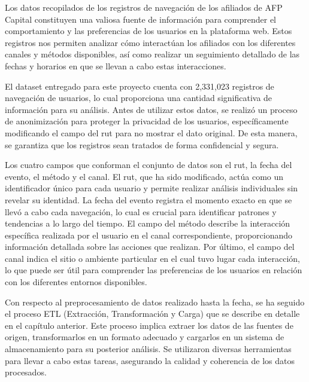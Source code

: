 Los datos recopilados de los registros de navegación de los afiliados de AFP Capital constituyen una valiosa fuente de información para comprender el comportamiento y las preferencias de los usuarios en la plataforma web. Estos registros nos permiten analizar cómo interactúan los afiliados con los diferentes canales y métodos disponibles, así como realizar un seguimiento detallado de las fechas y horarios en que se llevan a cabo estas interacciones.

El dataset entregado para este proyecto cuenta con 2,331,023 registros de navegación de usuarios, lo cual proporciona una cantidad significativa de información para su análisis. Antes de utilizar estos datos, se realizó un proceso de anonimización para proteger la privacidad de los usuarios, específicamente modificando el campo del rut para no mostrar el dato original. De esta manera, se garantiza que los registros sean tratados de forma confidencial y segura.

Los cuatro campos que conforman el conjunto de datos son el rut, la fecha del evento, el método y el canal. El rut, que ha sido modificado, actúa como un identificador único para cada usuario y permite realizar análisis individuales sin revelar su identidad. La fecha del evento registra el momento exacto en que se llevó a cabo cada navegación, lo cual es crucial para identificar patrones y tendencias a lo largo del tiempo. El campo del método describe la interacción específica realizada por el usuario en el canal correspondiente, proporcionando información detallada sobre las acciones que realizan. Por último, el campo del canal indica el sitio o ambiente particular en el cual tuvo lugar cada interacción, lo que puede ser útil para comprender las preferencias de los usuarios en relación con los diferentes entornos disponibles.

Con respecto al preprocesamiento de datos realizado hasta la fecha, se ha seguido el proceso ETL (Extracción, Transformación y Carga) que se describe en detalle en el capítulo anterior. Este proceso implica extraer los datos de las fuentes de origen, transformarlos en un formato adecuado y cargarlos en un sistema de almacenamiento para su posterior análisis. Se utilizaron diversas herramientas para llevar a cabo estas tareas, asegurando la calidad y coherencia de los datos procesados.

